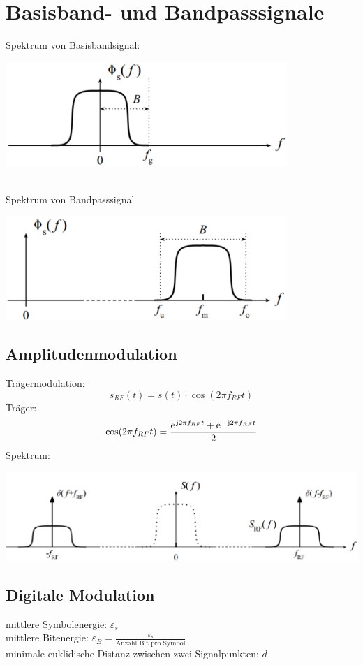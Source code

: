 \chapter{Basisband- und Bandpasssignale}
Spektrum von Basisbandsignal:
\begin{center}
	\includegraphics[width=0.8\textwidth]{./images/spek_basis}
\end{center}
~\\
Spektrum von Bandpasssignal
\begin{center}
	\includegraphics[width=0.8\textwidth]{./images/spek_bandp}
\end{center}

\section{Amplitudenmodulation}
Trägermodulation:
\[
	s_{RF}(t) = s(t) \cdot \cos(2\pi f_{RF} t)
\]
Träger:
\[
	\cos(2\pi f_{RF} t)	= \frac{\e^{\im 2 \pi f_{RF} t} + \e^{-\im 2 \pi f_{RF} t}}{2}
\]
Spektrum:
\begin{center}
	\includegraphics[width=.8\textwidth]{images/spek_band.png}
\end{center}

\section{Digitale Modulation}
mittlere Symbolenergie: $\varepsilon_s$ \\
mittlere Bitenergie: $ \varepsilon_B = \frac{\varepsilon_s}{\textrm{Anzahl Bit pro Symbol}} $ \\
minimale euklidische Distanz zwischen zwei Signalpunkten: $ d $
